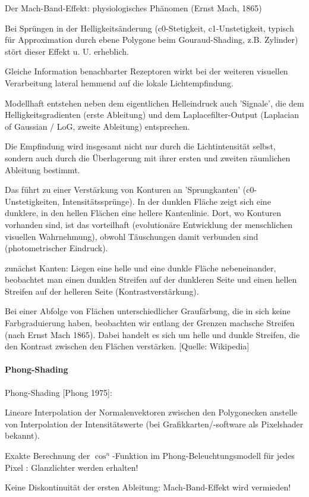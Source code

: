 \documentclass[landscape]{article}
\begin{document}
\begin{multicols}{3}
  Der Mach-Band-Effekt: physiologisches Phänomen (Ernst Mach, 1865)
  \begin{itemize*}
    \item Bei Sprüngen in der Helligkeitsänderung (c0-Stetigkeit, c1-Unstetigkeit, typisch für Approximation durch ebene Polygone beim Gouraud-Shading, z.B. Zylinder) stört dieser Effekt u. U. erheblich.
    \item Gleiche Information benachbarter Rezeptoren wirkt bei der weiteren visuellen Verarbeitung lateral hemmend auf die lokale Lichtempfindung.
    \item Modellhaft entstehen neben dem eigentlichen Helleindruck auch 'Signale', die dem Helligkeitsgradienten (erste Ableitung) und dem Laplacefilter-Output (Laplacian of Gaussian / LoG, zweite Ableitung) entsprechen.
    \item Die Empfindung wird insgesamt nicht nur durch die Lichtintensität selbst, sondern auch durch die Überlagerung mit ihrer ersten und zweiten räumlichen Ableitung bestimmt.
    \item Das führt zu einer Verstärkung von Konturen an 'Sprungkanten' (c0-Unstetigkeiten, Intensitätssprünge). In der dunklen Fläche zeigt sich eine dunklere, in den hellen Flächen eine hellere Kantenlinie. Dort, wo Konturen vorhanden sind, ist das vorteilhaft (evolutionäre Entwicklung der menschlichen visuellen Wahrnehmung), obwohl Täuschungen damit verbunden sind (photometrischer Eindruck).
    \item zunächst Kanten: Liegen eine helle und eine dunkle Fläche nebeneinander, beobachtet man einen dunklen Streifen auf der dunkleren Seite und einen hellen Streifen auf der helleren Seite (Kontrastverstärkung).
    \item Bei einer Abfolge von Flächen unterschiedlicher Graufärbung, die in sich keine Farbgraduierung haben, beobachten wir entlang der Grenzen machsche Streifen (nach Ernst Mach 1865). Dabei handelt es sich um helle und dunkle Streifen, die den Kontrast zwischen den Flächen verstärken. [Quelle: Wikipedia]
  \end{itemize*}
  
  \paragraph{Phong-Shading}
  Phong-Shading [Phong 1975]:
  \begin{itemize*}
    \item Lineare Interpolation der Normalenvektoren zwischen den Polygonecken anstelle von Interpolation der Intensitätswerte (bei Grafikkarten/-software als Pixelshader bekannt).
    \item Exakte Berechnung der $\cos^n$-Funktion im Phong-Beleuchtungsmodell für jedes Pixel : Glanzlichter werden erhalten!
    \item Keine Diskontinuität der ersten Ableitung: Mach-Band-Effekt wird vermieden!
  \end{itemize*}
  

\end{multicols}
\end{document}
